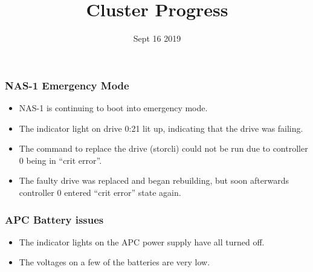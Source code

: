 \documentclass{beamer}
\title{Cluster Progress}
\date{Sept 16 2019}
\begin{document}

\begin{frame}
  \maketitle
\end{frame}



\begin{frame}
  \frametitle{NAS-1 Emergency Mode}

  \begin{itemize}
  \item NAS-1 is continuing to boot into emergency mode.
  \item The indicator light on drive 0:21 lit up, indicating that the drive was failing.
  \item The command to replace the drive (storcli) could not be run due to controller 0 being in ``crit error''.
  \item The faulty drive was replaced and began rebuilding, but soon afterwards controller 0 entered ``crit error'' state again.

  \end{itemize}


\end{frame}
\begin{frame}
  \frametitle{APC Battery issues}

  \begin{itemize}
  \item The indicator lights on the APC power supply have all turned off.
  \item The voltages on a few of the batteries are very low.

  \end{itemize}

  \end{frame}




\end{document}
